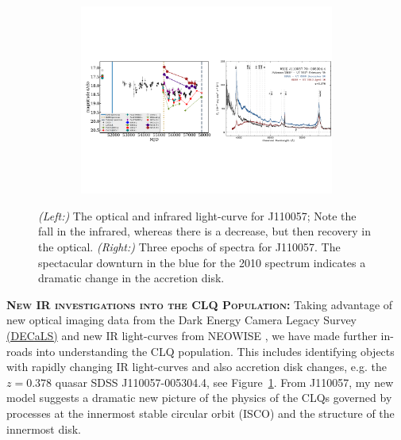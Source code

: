 \begin{figure}[h]
  \begin{center}
    \hspace{-0.5cm}
    \includegraphics[height=6.25cm,width=17.2cm]
    {figures/J110057_LC_Spectra_20171024.pdf}
    \vspace{-10pt}
    \caption{%
      \footnotesize 
      {\it (Left:)} The optical and infrared light-curve for J110057; 
      Note the fall in the infrared, whereas there is a decrease, but 
      then recovery in the optical. 
      {\it (Right:)} 
      Three epochs of spectra for J110057. 
      The spectacular downturn in the blue for the 2010 spectrum 
      indicates a dramatic change in the accretion disk.
    }
  \vspace{-16pt}
 \label{fig:J110057}
\end{center}
\end{figure}

\smallskip
\smallskip
\noindent
\textbf{\textsc{New IR investigations into the CLQ Population:}}
Taking advantage of new optical imaging data from the Dark Energy
Camera Legacy Survey \href{http://legacysurvey.org/decamls/}{(DECaLS)}
and new IR light-curves from NEOWISE \citep{Meisner2017a, Meisner2017b}, we have made further
in-roads into understanding the CLQ population. This includes
identifying objects with rapidly changing IR light-curves and also
accretion disk changes, e.g. the $z=0.378$ quasar SDSS
J110057-005304.4, see Figure~\ref{fig:J110057}. From J110057, my new
model \citep{Ross2018} suggests a dramatic new picture of the physics of the
CLQs governed by processes at the innermost stable circular orbit
(ISCO) and the structure of the innermost disk. 

